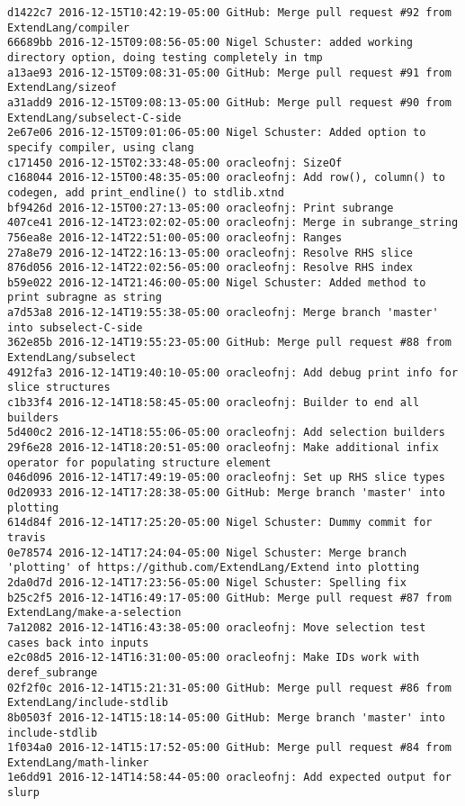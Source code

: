 \begin{lstlisting}
d1422c7 2016-12-15T10:42:19-05:00 GitHub: Merge pull request #92 from ExtendLang/compiler
66689bb 2016-12-15T09:08:56-05:00 Nigel Schuster: added working directory option, doing testing completely in tmp
a13ae93 2016-12-15T09:08:31-05:00 GitHub: Merge pull request #91 from ExtendLang/sizeof
a31add9 2016-12-15T09:08:13-05:00 GitHub: Merge pull request #90 from ExtendLang/subselect-C-side
2e67e06 2016-12-15T09:01:06-05:00 Nigel Schuster: Added option to specify compiler, using clang
c171450 2016-12-15T02:33:48-05:00 oracleofnj: SizeOf
c168044 2016-12-15T00:48:35-05:00 oracleofnj: Add row(), column() to codegen, add print_endline() to stdlib.xtnd
bf9426d 2016-12-15T00:27:13-05:00 oracleofnj: Print subrange
407ce41 2016-12-14T23:02:02-05:00 oracleofnj: Merge in subrange_string
756ea8e 2016-12-14T22:51:00-05:00 oracleofnj: Ranges
27a8e79 2016-12-14T22:16:13-05:00 oracleofnj: Resolve RHS slice
876d056 2016-12-14T22:02:56-05:00 oracleofnj: Resolve RHS index
b59e022 2016-12-14T21:46:00-05:00 Nigel Schuster: Added method to print subragne as string
a7d53a8 2016-12-14T19:55:38-05:00 oracleofnj: Merge branch 'master' into subselect-C-side
362e85b 2016-12-14T19:55:23-05:00 GitHub: Merge pull request #88 from ExtendLang/subselect
4912fa3 2016-12-14T19:40:10-05:00 oracleofnj: Add debug print info for slice structures
c1b33f4 2016-12-14T18:58:45-05:00 oracleofnj: Builder to end all builders
5d400c2 2016-12-14T18:55:06-05:00 oracleofnj: Add selection builders
29f6e28 2016-12-14T18:20:51-05:00 oracleofnj: Make additional infix operator for populating structure element
046d096 2016-12-14T17:49:19-05:00 oracleofnj: Set up RHS slice types
0d20933 2016-12-14T17:28:38-05:00 GitHub: Merge branch 'master' into plotting
614d84f 2016-12-14T17:25:20-05:00 Nigel Schuster: Dummy commit for travis
0e78574 2016-12-14T17:24:04-05:00 Nigel Schuster: Merge branch 'plotting' of https://github.com/ExtendLang/Extend into plotting
2da0d7d 2016-12-14T17:23:56-05:00 Nigel Schuster: Spelling fix
b25c2f5 2016-12-14T16:49:17-05:00 GitHub: Merge pull request #87 from ExtendLang/make-a-selection
7a12082 2016-12-14T16:43:38-05:00 oracleofnj: Move selection test cases back into inputs
e2c08d5 2016-12-14T16:31:00-05:00 oracleofnj: Make IDs work with deref_subrange
02f2f0c 2016-12-14T15:21:31-05:00 GitHub: Merge pull request #86 from ExtendLang/include-stdlib
8b0503f 2016-12-14T15:18:14-05:00 GitHub: Merge branch 'master' into include-stdlib
1f034a0 2016-12-14T15:17:52-05:00 GitHub: Merge pull request #84 from ExtendLang/math-linker
1e6dd91 2016-12-14T14:58:44-05:00 oracleofnj: Add expected output for slurp

\end{lstlisting}
